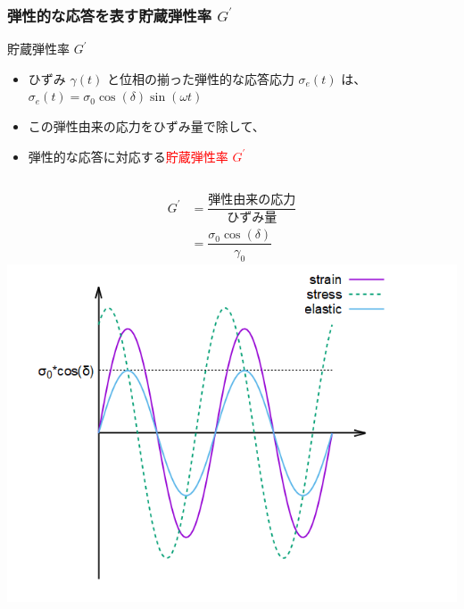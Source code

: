\documentclass[12pt, dvipdfmx]{beamer}
\begin{document}
\begin{frame}
    \frametitle{弾性的な応答を表す貯蔵弾性率 $G^{\prime}$}
		
		\begin{alertblock}{貯蔵弾性率 $G^{\prime}$}
			\begin{itemize}
				\item ひずみ $\gamma(t)$ と位相の揃った弾性的な応答応力 $\sigma_e(t)$ は、\\
				$\sigma_e(t) = \sigma_0 \cos(\delta)\sin(\omega t)$
				\item この弾性由来の応力をひずみ量で除して、
				\item 弾性的な応答に対応する\textcolor{red}{貯蔵弾性率 $G^{\prime}$}
			\end{itemize}
			\begin{columns}[c, onlytextwidth]
						\begin{align*}
							G^{\prime} &= \dfrac{\text{弾性由来の応力}}{\text{ひずみ量}} \\
							&= \dfrac{\sigma_0 \cos(\delta)}{\gamma_0}
						\end{align*}
					\centering
					\includegraphics[width=\textwidth]{dynamic_rheo/dyn_rheo_ela.png}
			\end{columns}
		\end{alertblock}
\end{frame}
\end{document}
